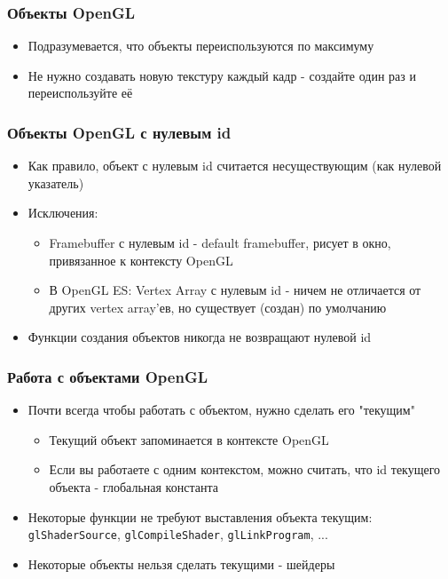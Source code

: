 \documentclass{beamer}
\begin{document}
\begin{frame}[fragile]
\frametitle{Объекты OpenGL}
\begin{itemize}
\item Подразумевается, что объекты переиспользуются по максимуму
\item Не нужно создавать новую текстуру каждый кадр - создайте один раз и переиспользуйте её
\end{itemize}
\end{frame}

\begin{frame}[fragile]
\frametitle{Объекты OpenGL с нулевым id}
\begin{itemize}
\item Как правило, объект с нулевым id считается несуществующим (как нулевой указатель)
\pause
\item Исключения:
\begin{itemize}
\item Framebuffer с нулевым id - default framebuffer, рисует в окно, привязанное к контексту OpenGL
\pause
\item В OpenGL ES: Vertex Array с нулевым id - ничем не отличается от других vertex array'ев, но существует (создан) по умолчанию
\end{itemize}
\pause
\item Функции создания объектов никогда не возвращают нулевой id
\end{itemize}
\end{frame}

\begin{frame}[fragile]
\frametitle{Работа с объектами OpenGL}
\begin{itemize}
\item Почти всегда чтобы работать с объектом, нужно сделать его "текущим"
\begin{itemize}
\item Текущий объект запоминается в контексте OpenGL
\item Если вы работаете с одним контекстом, можно считать, что id текущего объекта - глобальная константа
\end{itemize}
\pause
\item Некоторые функции не требуют выставления объекта текущим: \verb|glShaderSource|, \verb|glCompileShader|, \verb|glLinkProgram|, ...
\pause
\item Некоторые объекты нельзя сделать текущими - шейдеры
\end{itemize}
\end{frame}
\end{document}
